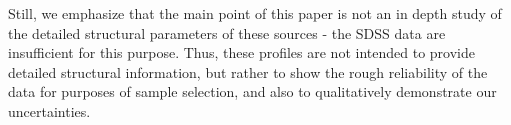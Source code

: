 \documentclass[twocolumn]{aastex6}
\begin{document}
Still, we emphasize that the main point of this paper is not an in depth study of the detailed structural parameters of these sources - the SDSS data are insufficient for this purpose. Thus, these profiles are not intended to provide detailed structural information, but rather to show the rough 
reliability of the data for purposes of sample selection, and also to qualitatively demonstrate our
uncertainties. 
\end{document}
